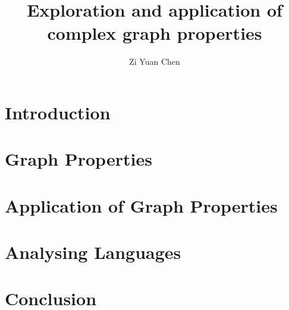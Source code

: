 \documentclass[12pt]{report}
\title{Exploration and application of complex graph properties}
\author{Zi Yuan Chen}
\date{}
\begin{document}



%




\tableofcontents


\listoffigures




\chapter{Introduction}


\chapter{Graph Properties}


\chapter{Application of Graph Properties}


\chapter{Analysing Languages}


\chapter{Conclusion}






\end{document}

